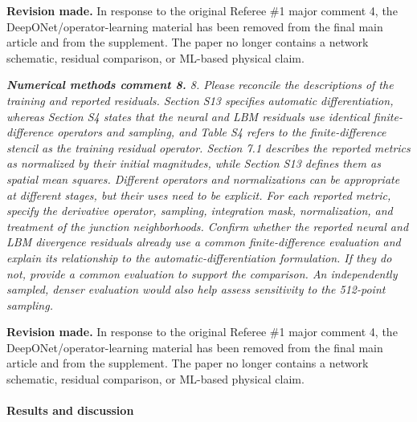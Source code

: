 \documentclass[11pt,a4paper]{article}
\newcommand{\qcomment}[1]{\textcolor{deepblue}{\itshape #1}}
\newcommand{\revwork}[1]{\textbf{\textcolor{revgreen}{#1}}}
\begin{document}
\noindent\revwork{Revision made.} In response to the original Referee \#1 major comment 4, the DeepONet/operator-learning material has been removed from the final main article and from the supplement. The paper no longer contains a network schematic, residual comparison, or ML-based physical claim.

\medskip
\noindent\qcomment{\textbf{Numerical methods comment 8.} 8. Please reconcile the descriptions of the training and reported residuals. Section S13 specifies automatic differentiation, whereas Section S4 states that the neural and LBM residuals use identical finite-difference operators and sampling, and Table S4 refers to the finite-difference stencil as the training residual operator. Section 7.1 describes the reported metrics as normalized by their initial magnitudes, while Section S13 defines them as spatial mean squares. Different operators and normalizations can be appropriate at different stages, but their uses need to be explicit. For each reported metric, specify the derivative operator, sampling, integration mask, normalization, and treatment of the junction neighborhoods. Confirm whether the reported neural and LBM divergence residuals already use a common finite-difference evaluation and explain its relationship to the automatic-differentiation formulation. If they do not, provide a common evaluation to support the comparison. An independently sampled, denser evaluation would also help assess sensitivity to the 512-point sampling.}

\noindent\revwork{Revision made.} In response to the original Referee \#1 major comment 4, the DeepONet/operator-learning material has been removed from the final main article and from the supplement. The paper no longer contains a network schematic, residual comparison, or ML-based physical claim.

\medskip
\paragraph{Results and discussion}
\end{document}
